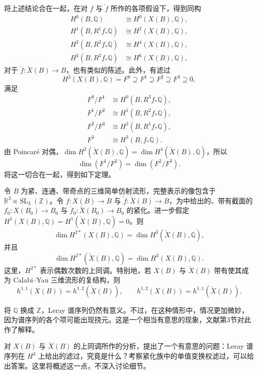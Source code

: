 将上述结论合在一起，在对 $f$ 与 $\check f$ 所作的各项假设下，得到同构
\[
\begin{aligned}
H^0(B,\mathbb Q)&\cong H^0(X(B),\mathbb Q),\\
H^1(B,R^1f_*\mathbb Q)&\cong H^2(X(B),\mathbb Q),\\
H^2(B,R^2f_*\mathbb Q)&\cong H^4(X(B),\mathbb Q),\\
H^3(B,R^3f_*\mathbb Q)&\cong H^6(X(B),\mathbb Q),
\end{aligned}
\]
对于 $\check f\colon\check X(B)\to B$，也有类似的陈述。此外，有滤过
\[
H^3(X(B),\mathbb Q)=F^0\supseteq F^1\supseteq F^2\supseteq F^3\supseteq0,
\]
满足
\[
\begin{aligned}
F^0/F^1&\cong H^0(B,R^3f_*\mathbb Q),\\
F^1/F^2&\cong H^1(B,R^2f_*\mathbb Q),\\
F^2/F^3&\cong H^2(B,R^1f_*\mathbb Q),\\
F^3&\cong H^3(B,f_*\mathbb Q).
\end{aligned}
\]
由 Poincaré 对偶，$\dim H^2(\check X(B),\mathbb Q)=\dim H^4(\check X(B),\mathbb Q)$，所以
\[
\dim(F^1/F^2)=\dim(F^2/F^3).
\]
将这一切合在一起，得到如下定理。

\begin{theorem}\label{thm:6.103}
令 $B$ 为紧、连通、带奇点的三维简单仿射流形，完整表示的像包含于 $\mathbb R^3\rtimes\operatorname{SL}_3(\mathbb Z)$。令 $f\colon X(B)\to B$ 与 $\check f\colon\check X(B)\to B$，为中给出的、带有截面的 $f_0\colon X(B_0)\to B_0$ 与 $\check f_0\colon\check X(B_0)\to B_0$ 的紧化。进一步假定 $H^1(X(B),\mathbb Q)=H^1(\check X(B),\mathbb Q)=0$。则
\[
\dim H^{2*}(X(B),\mathbb Q)=\dim H^3(\check X(B),\mathbb Q),
\]
并且
\[
\dim H^{2*}(\check X(B),\mathbb Q)=\dim H^3(X(B),\mathbb Q).
\]
这里，$H^{2*}$ 表示偶数次数的上同调。特别地，若 $X(B)$ 与 $\check X(B)$ 带有使其成为 Calabi--Yau 三维流形的复结构，则
\[
h^{1,1}(X(B))=h^{1,2}(\check X(B)),\qquad
h^{1,2}(X(B))=h^{1,1}(\check X(B)).
\]
\end{theorem}

将 $\mathbb Q$ 换成 $\mathbb Z$，Leray 谱序列仍然有意义。不过，在这种情形中，情况更加微妙，因为谱序列的各个项可能出现挠元。这是一个相当有意思的现象，文献第3节对此作了解释。

对 $X(B)$ 与 $\check X(B)$ 的上同调所作的分析，提出了一个有意思的问题：Leray 谱序列在 $H^3$ 上给出的滤过，究竟是什么？考察紧化族中的单值变换权滤过，可以给出答案。这里将概述这一点，不深入讨论细节。

